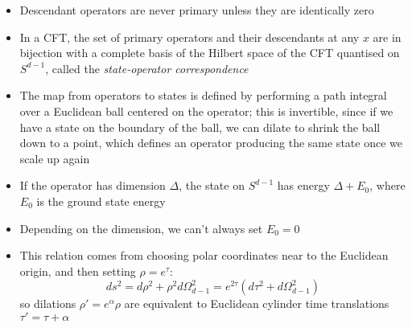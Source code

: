 \documentclass[12pt,a4paper]{article}
\numberwithin{equation}{section}
\begin{document}
\begin{itemize}
		\item Descendant operators are never primary unless they are identically zero
		\item In a CFT, the set of primary operators and their descendants at any $x$ are in bijection with a complete basis of the Hilbert space of the CFT quantised on $S^{d-1}$, called the \textit{state-operator correspondence}
		\item The map from operators to states is defined by performing a path integral over a Euclidean ball centered on the operator; this is invertible, since if we have a state on the boundary of the ball, we can dilate to shrink the ball down to a point, which defines an operator producing the same state once we scale up again
		\item If the operator has dimension $\Delta$, the state on $S^{d-1}$ has energy $\Delta+E_{0}$, where $E_{0}$ is the ground state energy
		\item Depending on the dimension, we can't always set $E_{0}=0$
		\item This relation comes from choosing polar coordinates near to the Euclidean origin, and then setting $\rho=e^{\tau}$:
		\begin{equation}
			ds^{2}=d\rho^{2}+\rho^{2}d\Omega_{d-1}^{2}=e^{2\tau}(d\tau^{2}+d\Omega_{d-1}^{2})
		\end{equation}
		so dilations $\rho'=e^{\alpha}\rho$ are equivalent to Euclidean cylinder time translations $\tau'=\tau+\alpha$
	\end{itemize}
\end{document}
